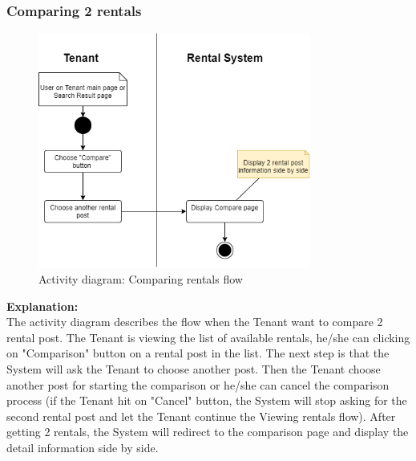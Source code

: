 \subsubsection{Comparing 2 rentals}
\begin{figure}[H]
    \centering
    \includegraphics[width=0.8\textwidth]{Images/Activity/ac_diag_compare_2_rentals.png}
    \caption{Activity diagram: Comparing rentals flow}
    \label{fig:compare-rentals}
\end{figure}
\noindent \textbf{Explanation:}\\
The activity diagram describes the flow when the Tenant want to compare 2 rental post. The Tenant is viewing the list of available rentals, he/she can clicking on "Comparison" button on a rental post in the list. The next step is that the System will ask the Tenant to choose another post. Then the Tenant choose another post for starting the comparison or he/she can cancel the comparison process (if the Tenant hit on "Cancel" button, the System will stop asking for the second rental post and let the Tenant continue the Viewing rentals flow). After getting 2 rentals, the System will redirect to the comparison page and display the detail information side by side.


